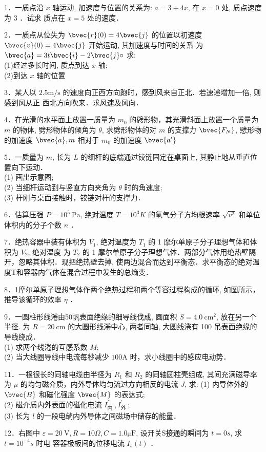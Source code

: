 
1．一质点沿 $x$ 轴运动, 加速度与位置的关系为: $a=3+4 x$, 在 $x=0$ 处, 质点速度为 3 ．试求 质点在 $x=5$ 处的速度．

2．一质点从位失为 $\bvec{r}(0)=4 \bvec{j}$ 的位置以初速度 $\bvec{v}(0)=4 \bvec{j}$ 开始运动, 其加速度与时间的关系 为 $\bvec{a}=3 t \bvec{i}-2 \bvec{j} \circ$ 求:\\
(1)经过多长时间, 质点到达 $x$ 轴;\\
(2)到达 $x$ 轴的位置

3．某人以 $2.5 \mathrm{m / s}$ 的速度向正西方向跑时，感到风来自正北．若速递增加一倍, 则感到风从正 西北方向吹来．求风速及风向．

4．在光滑的水平面上放置一质量为 $m_{0}$ 的憵形物，其光滑斜面上放置一个质量为 $m$ 的物体, 劈形物体的倾角为 $\theta$, 求劈形物体的对 $m$ 的支撑力 $\bvec{F_{N}}$, 憵形物的加速度 $\bvec{a}, m$ 相对于 $m_{0}$ 的加速度 $\bvec{a^{\prime}}$

5．一质量为 $m$, 长为 $L$ 的细杆的底端通过铰链固定在桌面上, 其静止地从垂直位置向下运动．\\
(1) 画出示意图;\\
(2) 当细杆运动到与竖直方向夹角为 $\theta$ 时的角速度;\\
(3) 杆刚与桌面接触时，铰链对杆的支撑力．

6．估算压强 $P=10^{5} \mathrm{~Pa}$, 绝对温度 $T=10^{3} K$ 的氢气分子方均根速率 $\sqrt{v^{2}}$ 和单位体积内的分子个数 $n$ ．

7．绝热容器中装有体积为 $V_{1}$, 绝对温度为 $T_{1}$ 的 1 摩尔单原子分子理想气体和体积为 $V_{2}$, 绝对温度 为 $T_{2}$ 的 1 摩尔单原子分子理想气体．两部分气体用绝热壁隔开，忽略其体积．现把绝热壁去掉, 使两边混合而达到平衡态．求平衡态的绝对温度T和容器内气体在混合过程中发生的总熵变．

8．1摩尔单原子理想气体作两个绝热过程和两个等容过程构成的循环, 如图所示，推导该循环的效率 $\eta$ ．

9．一圆柱形线淃由50帆表面绝缘的细导线伐成, 圆面积 $S=4.0 \mathrm{~cm}^{2}$, 放在另一个半径. 为 $R=20 \mathrm{~cm}$ 的大圆形线淃中心, 两者同轴, 大圆线淃有 100 吊表面绝缘的导线绕成．\\
(1) 求两个线淃的互感系数 $M$;\\
(2) 当大线圈导线中电流每秒减少 $100\mathrm{A}$ 时，求小线圈中的感应电动势．

11．一根很长的同轴电缆由半径为 $R_{1}$ 和 $R_{2}$ 的同轴圆柱壳组成, 其间充满磁导率为 $\mu$ 的均匀磁介质，内外导体均匀流过方向相反的电流 $J$, 求:
(1) 内导体外的 $\bvec{B}$ 和磁化强度 $\bvec{M}$ 的表达式;\\
(2) 磁介质内外表面的磁化电流 $I_{\text {内 }}^{\prime}, I_{\text {外 }}^{\prime}$;\\
(3) 长为 $l$ 的一段电绱内外导体之间磁场中储存的能量．

12．右图中 $\varepsilon=20 \mathrm{~V}, R=10 \Omega, C=1.0\mathrm{\mu F}$, 设开关S接通的瞬间为 $t=0 s$, 求 $t=10^{-4} s$ 时电 容器极板间的位移电流 $I_{s}(t)$ ．